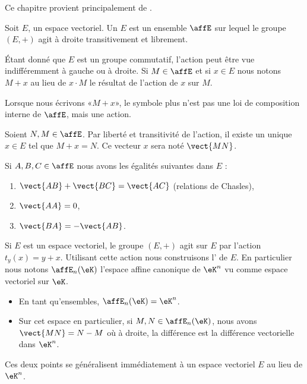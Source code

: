 
Ce chapitre provient principalement de \cite{Combes}.

\begin{definition}
    Soit \( E\), un espace vectoriel. Un  \( E\) est un ensemble \( \affE\) sur lequel le groupe \( (E,+)\) agit à droite transitivement et librement.
\end{definition}

Étant donné que \( E\) est un groupe commutatif, l'action peut être vue indifféremment à gauche ou à droite. Si \( M\in\affE\) et si \( x\in E\) nous notons \( M+x\) au lieu de \( x\cdot M\) le résultat de l'action de \( x\) sur \( M\).

\begin{normaltext}      \label{NORMooZANAooQdXqlh}
    Lorsque nous écrivons «\( M+x\)», le symbole plus n'est pas une loi de composition interne de \( \affE\), mais une action.

    Soient \( N,M\in\affE\). Par liberté et transitivité de l'action, il existe un unique \( x\in E\) tel que \( M+x=N\). Ce vecteur \( x\) sera noté \( \vect{ MN }\).
\end{normaltext}

\begin{proposition}     \label{PROPooCOZCooCghwaR}
    Si \( A,B,C\in\affE\) nous avons les égalités suivantes dans \( E\) :
    \begin{enumerate}
        \item   \label{ITEMooSDMIooUQiKeW}
            \( \vect{ AB }+\vect{ BC }=\vect{ AC }\) (relations de Chasles),
        \item
            \( \vect{ AA }=0\),
        \item
            \( \vect{ BA }=-\vect{ AB }\).
    \end{enumerate}
\end{proposition}

\begin{normaltext}      \label{NORMooXAJLooIupekj}
    Si \( E\) est un espace vectoriel, le groupe \( (E,+)\) agit sur \( E\) par l'action \( t_y(x)=y+x\). Utilisant cette action nous construisons l' de \( E\). En particulier nous notons \( \affE_n(\eK)\) l'espace affine canonique de \( \eK^n\) vu comme espace vectoriel sur \( \eK\).
    \begin{itemize}
        \item
            En tant qu'ensembles, \( \affE_n(\eK)=\eK^n\).
        \item
            Sur cet espace en particulier, si \( M,N\in\affE_n(\eK)\), nous avons \( \vect{ MN }=N-M\) où à droite, la différence est la différence vectorielle dans \(\eK^n\).
    \end{itemize}

    Ces deux points se généralisent immédiatement à un espace vectoriel \( E\) au lieu de \( \eK^n\).
\end{normaltext}

